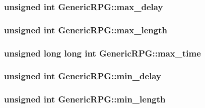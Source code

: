 \hypertarget{classGenericRPG_47f854be66ca4cbd5b08aa5c1786bb48}{
\subsubsection[{max\_\-delay}]{\setlength{\rightskip}{0pt plus 5cm}unsigned int {\bf GenericRPG::max\_\-delay}}}
\label{classGenericRPG_47f854be66ca4cbd5b08aa5c1786bb48}


\hypertarget{classGenericRPG_68d1f82964a4b5c87dd69628912b673f}{
\subsubsection[{max\_\-length}]{\setlength{\rightskip}{0pt plus 5cm}unsigned int {\bf GenericRPG::max\_\-length}}}
\label{classGenericRPG_68d1f82964a4b5c87dd69628912b673f}


\hypertarget{classGenericRPG_f306e29286f956ddf0cb021cdd435e93}{
\subsubsection[{max\_\-time}]{\setlength{\rightskip}{0pt plus 5cm}unsigned long long int {\bf GenericRPG::max\_\-time}}}
\label{classGenericRPG_f306e29286f956ddf0cb021cdd435e93}


\hypertarget{classGenericRPG_dbc8b0ba3301646835680aabb98e37bd}{
\subsubsection[{min\_\-delay}]{\setlength{\rightskip}{0pt plus 5cm}unsigned int {\bf GenericRPG::min\_\-delay}}}
\label{classGenericRPG_dbc8b0ba3301646835680aabb98e37bd}


\hypertarget{classGenericRPG_c149370e5d8291090e067e86b1bd5d6d}{
\subsubsection[{min\_\-length}]{\setlength{\rightskip}{0pt plus 5cm}unsigned int {\bf GenericRPG::min\_\-length}}}
\label{classGenericRPG_c149370e5d8291090e067e86b1bd5d6d}


